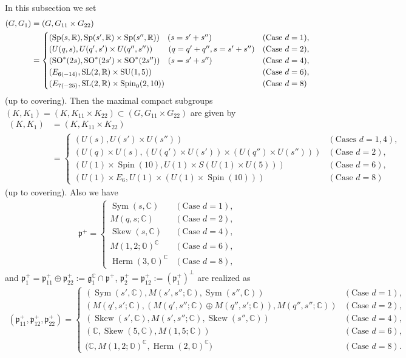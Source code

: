 \documentclass[pdftex]{sigma}
\numberwithin{equation}{section}
\newcommand{\BR}{\mathbb{R}}
\newcommand{\BC}{\mathbb{C}}
\newcommand{\BO}{\mathbb{O}}
\newcommand{\fg}{\mathfrak{g}}
\newcommand{\fp}{\mathfrak{p}}
\newcommand{\Sym}{\operatorname{Sym}}
\newcommand{\Skew}{\operatorname{Skew}}
\newcommand{\Herm}{\operatorname{Herm}}
\begin{document}
In this subsection we set
\begin{align*}
(G,G_1)&=(G,G_{11}\times G_{22})\\
&= \begin{cases}(\operatorname{Sp}(s,\BR), \operatorname{Sp}(s',\BR)\times \operatorname{Sp}(s'',\BR)) \quad (s=s'+s'')& (\text{Case }d=1),\\
(U(q,s), U(q',s')\times U(q'',s'')) \quad \ \ \ (q=q'+q'',s=s'+s'')& (\text{Case }d=2),\\
(\operatorname{SO}^*(2s), \operatorname{SO}^*(2s')\times \operatorname{SO}^*(2s'')) \quad (s=s'+s'')& (\text{Case }d=4),\\
(E_{6(-14)}, {\rm SL}(2,\BR)\times \operatorname{SU}(1,5)) & (\text{Case }d=6),\\
(E_{7(-25)},{\rm SL}(2,\BR)\times \operatorname{Spin}_0(2,10)) & (\text{Case }d=8) \end{cases}
\end{align*}
(up to covering). Then the maximal compact subgroups $(K,K_1)=(K,K_{11}\times K_{22})\subset (G,G_{11}\times G_{22})$ are given by
\begin{align*}
(K,K_1)&=(K,K_{11}\times K_{22})\\
&=\begin{cases} (U(s), U(s')\times U(s''))& (\text{Cases }d=1,4),\\
(U(q)\times U(s), (U(q')\times U(s'))\times (U(q'')\times U(s'')))& (\text{Case }d=2),\\
(U(1)\times \operatorname{Spin}(10), U(1)\times S(U(1)\times U(5)))& (\text{Case }d=6),\\
(U(1)\times E_6,U(1)\times (U(1)\times \operatorname{Spin}(10)))& (\text{Case }d=8)	 \end{cases}
\end{align*}
(up to covering). Also we have
\begin{gather*} \fp^+=\begin{cases}\Sym(s,\BC) & (\text{Case }d=1),\\ M(q,s;\BC) & (\text{Case }d=2),\\ \Skew(s,\BC) & (\text{Case }d=4),\\
M(1,2;\BO)^\BC & (\text{Case }d=6),\\ \Herm(3,\BO)^\BC & (\text{Case }d=8), \end{cases} \end{gather*}
and $\fp^+_1=\fp^+_{11}\oplus\fp^+_{22}:=\fg_1^\BC\cap\fp^+$, $\fp^+_2=\fp^+_{12}:=(\fp^+_1)^\bot$ are realized as
\begin{gather*} (\fp^+_{11},\fp^+_{12},\fp^+_{22})=\begin{cases}
(\Sym(s',\BC), M(s',s'';\BC), \Sym(s'',\BC)) & (\text{Case }d=1),\\
(M(q',s';\BC), (M(q',s'';\BC)\oplus M(q'',s';\BC)), M(q'',s'';\BC))\! & (\text{Case }d=2),\\
(\Skew(s',\BC), M(s',s'';\BC), \Skew(s'',\BC)) & (\text{Case }d=4),\\
(\BC, \Skew(5,\BC), M(1,5;\BC)) & (\text{Case }d=6),\\
\big(\BC, M(1,2;\BO)^\BC, \Herm(2,\BO)^\BC\big) & (\text{Case }d=8). \end{cases} \end{gather*}
\end{document}
